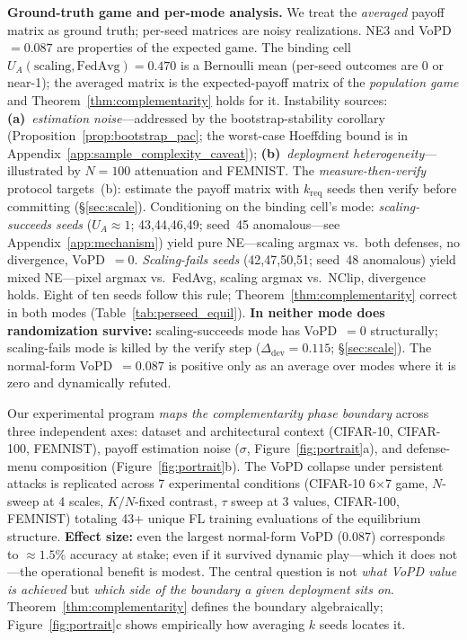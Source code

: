 \documentclass{article}
\begin{document}
\textbf{Ground-truth game and per-mode analysis.} We treat the \emph{averaged} payoff matrix as ground truth; per-seed matrices are noisy realizations. NE3 and VoPD~$= 0.087$ are properties of the expected game. The binding cell $U_A(\text{scaling}, \text{FedAvg}) = 0.470$ is a Bernoulli mean (per-seed outcomes are 0 or near-1); the averaged matrix is the expected-payoff matrix of the \emph{population game} and Theorem~\ref{thm:complementarity} holds for it. Instability sources: \textbf{(a)}~\emph{estimation noise}---addressed by the bootstrap-stability corollary (Proposition~\ref{prop:bootstrap_pac}; the worst-case Hoeffding bound is in Appendix~\ref{app:sample_complexity_caveat}); \textbf{(b)}~\emph{deployment heterogeneity}---illustrated by $N=100$ attenuation and FEMNIST. The \emph{measure-then-verify} protocol targets~(b): estimate the payoff matrix with $k_{\mathrm{req}}$ seeds then verify before committing (§\ref{sec:scale}). Conditioning on the binding cell's mode: \emph{scaling-succeeds seeds} ($U_A\approx1$; 43,44,46,49; seed~45 anomalous---see Appendix~\ref{app:mechanism}) yield pure NE---scaling argmax vs.\ both defenses, no divergence, VoPD~$=0$. \emph{Scaling-fails seeds} (42,47,50,51; seed~48 anomalous) yield mixed NE---pixel argmax vs.\ FedAvg, scaling argmax vs.\ NClip, divergence holds. Eight of ten seeds follow this rule; Theorem~\ref{thm:complementarity} correct in both modes (Table~\ref{tab:perseed_equil}). \textbf{In neither mode does randomization survive:} scaling-succeeds mode has VoPD~$=0$ structurally; scaling-fails mode is killed by the verify step ($\Delta_{\mathrm{dev}}=0.115$; §\ref{sec:scale}). The normal-form VoPD~$=0.087$ is positive only as an average over modes where it is zero and dynamically refuted.

Our experimental program \emph{maps the complementarity phase boundary} across three independent axes: dataset and architectural context (CIFAR-10, CIFAR-100, FEMNIST), payoff estimation noise ($\sigma$, Figure~\ref{fig:portrait}a), and defense-menu composition (Figure~\ref{fig:portrait}b). The VoPD collapse under persistent attacks is replicated across 7 experimental conditions (CIFAR-10 6$\times$7 game, $N$-sweep at 4 scales, $K/N$-fixed contrast, $\tau$ sweep at 3 values, CIFAR-100, FEMNIST) totaling 43+ unique FL training evaluations of the equilibrium structure. \textbf{Effect size:} even the largest normal-form VoPD (0.087) corresponds to ${\approx}1.5\%$ accuracy at stake; even if it survived dynamic play---which it does not---the operational benefit is modest. The central question is not \emph{what VoPD value is achieved} but \emph{which side of the boundary a given deployment sits on}. Theorem~\ref{thm:complementarity} defines the boundary algebraically; Figure~\ref{fig:portrait}c shows empirically how averaging $k$ seeds locates it.
\end{document}
